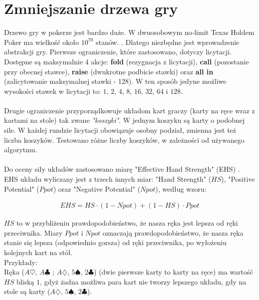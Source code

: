 \documentclass[licencjacka]{pracamgr}
\begin{document}
\section{Zmniejszanie drzewa gry}

Drzewo gry w pokerze jest bardzo duże. W dwuosobowym no-limit Texas Holdem Poker ma wielkość
około $10^{70}$ stanów. \cite{monte-carlo}. Dlatego niezbędne jest wprowadzenie abstrakcji gry.
Pierwsze ograniczenie, które zastosowano, dotyczy licytacji. Dostępne są maksymalnie 4 akcje:
\textbf{fold} (rezygnacja z licytacji), \textbf{call} (pozostanie przy obecnej stawce), \textbf{raise} (dwukrotne podbicie stawki) oraz
\textbf{all in} (zalicytowanie maksymalnej stawki - 128). W ten sposób jedyne możliwe wysokości stawek w licytacji to: $1$, $2$,
$4$, $8$, $16$, $32$, $64$ i $128$. \\\\
\noindent
Drugie ograniczenie przyporządkowuje układom kart graczy (karty na ręce wraz z kartami na stole) tak zwane \emph{"koszyki"}. \cite[sekcja 4.4]{buckets}
W jednym koszyku są karty o podobnej sile. W każdej rundzie licytacji obowiązuje osobny podział, zmienna
jest też liczba koszyków. Testowano różne liczby koszyków, w zależności od używanego algorytmu. \\\\
\noindent
Do oceny siły układów zastosowano miarę "Effective Hand Strength" (EHS) \cite{ehs}. EHS układu wyliczany
jest z trzech innych miar: "Hand Strength" ($HS$), "Positive Potential" ($Ppot$) oraz "Negative Potential" ($Npot$), według
wzoru:

\begin{align*}
EHS = HS \cdot (1 - Npot) + (1 - HS) \cdot Ppot
\end{align*}

\noindent
$HS$ to w przybliżeniu prawdopodobieństwo, że nasza ręka jest lepsza od ręki przeciwnika. Miary $Ppot$ i $Npot$ oznaczają
prawdopodobieństwo, że nasza ręka stanie się lepsza (odpowiednio gorsza) od ręki przeciwnika, po wyłożeniu kolejnych kart na stół. \\

\noindent
Przykłady: \\

\noindent
Ręka ($A\heartsuit$, $A\clubsuit$ ; $A\diamondsuit$, $5\spadesuit$, $2\clubsuit$) (dwie pierwsze karty to karty na ręce) ma wartość $HS$
bliską $1$, gdyż żadna możliwa para kart nie tworzy lepszego układu, gdy na stole są karty ($A\diamondsuit$, $5\spadesuit$, $2\clubsuit$). \\
\end{document}
